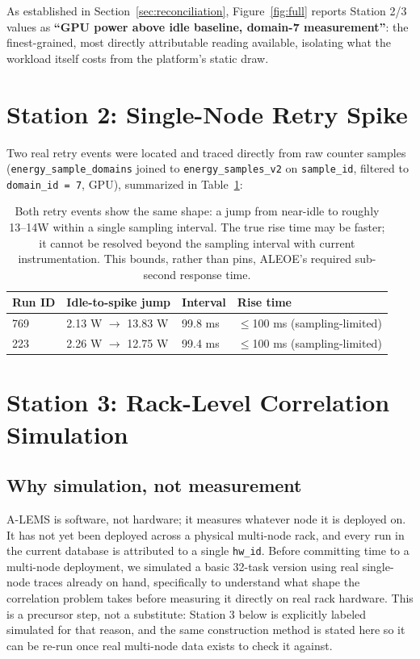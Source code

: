 \documentclass[10pt]{article}
\begin{document}
As established in Section~\ref{sec:reconciliation}, Figure~\ref{fig:full}
reports Station 2/3 values as \textbf{``GPU power above idle baseline,
domain-7 measurement''}: the finest-grained, most directly attributable
reading available, isolating what the workload itself costs from the
platform's static draw.

\section{Station 2: Single-Node Retry Spike}

Two real retry events were located and traced directly from raw counter
samples (\texttt{energy\_sample\_domains} joined to \texttt{energy\_samples\_v2}
on \texttt{sample\_id}, filtered to \texttt{domain\_id = 7}, GPU),
summarized in Table~\ref{tab:retryspike}:

\begin{table}[h]
\centering
\small
\begin{tabularx}{\textwidth}{lXXX}
\toprule
\textbf{Run ID} & \textbf{Idle-to-spike jump} & \textbf{Interval} & \textbf{Rise time} \\
\midrule
769 & 2.13 W $\to$ 13.83 W & 99.8 ms & $\leq$100 ms (sampling-limited) \\
223 & 2.26 W $\to$ 12.75 W & 99.4 ms & $\leq$100 ms (sampling-limited) \\
\bottomrule
\end{tabularx}
\vspace{-2pt}
\caption{Both retry events show the same shape: a jump from near-idle to
roughly 13--14W within a single sampling interval. The true rise time may be
faster; it cannot be resolved beyond the sampling interval with current
instrumentation. This bounds, rather than pins, ALEOE's required sub-second
response time.}
\label{tab:retryspike}
\end{table}

\section{Station 3: Rack-Level Correlation Simulation}

\subsection{Why simulation, not measurement}

A-LEMS is software, not hardware; it measures whatever node it is deployed
on. It has not yet been deployed across a physical multi-node rack, and
every run in the current database is attributed to a single
\texttt{hw\_id}. Before committing time to a multi-node deployment, we
simulated a basic 32-task version using real single-node traces already on
hand, specifically to understand what shape the correlation problem takes
before measuring it directly on real rack hardware. This is a precursor
step, not a substitute: Station 3 below is explicitly labeled simulated for
that reason, and the same construction method is stated here so it can be
re-run once real multi-node data exists to check it against.
\end{document}
